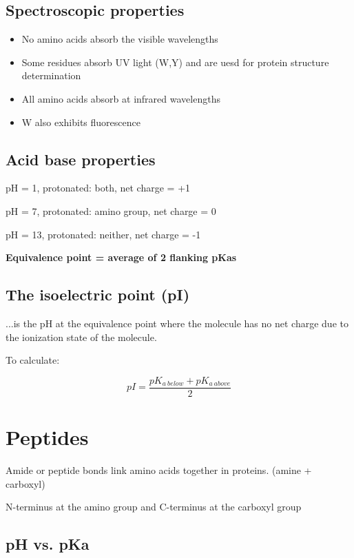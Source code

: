 \documentclass[letterpaper, 12pt]{article}
\begin{document}
\subsection*{Spectroscopic properties}

\begin{itemize}
\item No amino acids absorb the visible wavelengths
\item Some residues absorb UV light (W,Y) and are uesd for protein structure determination
\item All amino acids absorb at infrared wavelengths
\item W also exhibits fluorescence
\end{itemize}

\subsection*{Acid base properties}

pH = 1, protonated: both, net charge = +1

pH = 7, protonated: amino group, net charge = 0

pH = 13, protonated: neither, net charge = -1

\textbf{Equivalence point = average of 2 flanking pKas}

\subsection*{The isoelectric point (pI)}
...is the pH at the equivalence point where the molecule has no net charge due to the ionization state of the molecule.

To calculate:

\begin{equation}
pI = \frac{pK_{a \: below} + pK_{a \: above}}{2}
\end{equation}

\newpage

\section*{Peptides}

Amide or peptide bonds link amino acids together in proteins. (amine + carboxyl)

N-terminus at the amino group and C-terminus at the carboxyl group

\subsection*{pH vs. pKa}
\end{document}
